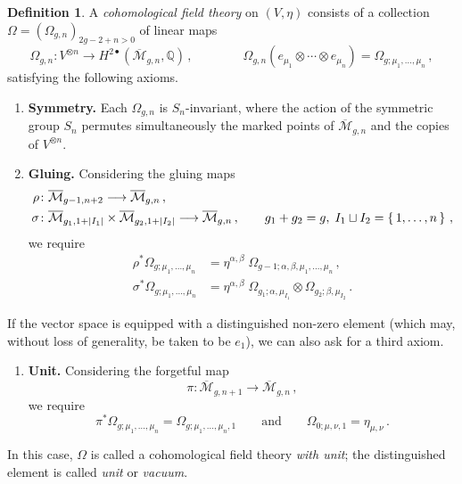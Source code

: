 \documentclass[11pt,reqno]{amsart}
\numberwithin{equation}{section}
\newcommand{\mb}[1]{\mathbb{#1}}
\newcommand{\mc}[1]{\mathcal{#1}}
\newcommand{\Q}{\mb{Q}}
\newcommand{\M}{\mc{M}}
\newcommand{\Mbar}{\overline{\M}}
\theoremstyle{plain}
\theoremstyle{definition}
\newtheorem{definition}[theorem]{Definition}
\begin{document}
\begin{definition}
  A \emph{cohomological field theory} on $(V,\eta)$ consists of a collection $\Omega = (\Omega_{g,n})_{2g-2+n>0}$ of linear maps
  \begin{equation}
    \Omega_{g,n} \colon V^{\otimes n} \longrightarrow H^{2\bullet}(\Mbar_{g,n},\Q) \,,
    \qquad\qquad
    \Omega_{g,n}(e_{\mu_1} \otimes \cdots \otimes e_{\mu_n})
    =
    \Omega_{g;\mu_1,\ldots,\mu_n} \,,
  \end{equation}
  satisfying the following axioms.
  \begin{enumerate}
    \item[i)] \textbf{Symmetry.} Each $\Omega_{g,n}$ is $S_n$-invariant, where the action of the symmetric group $S_n$ permutes simultaneously the marked points of $\Mbar_{g,n}$ and the copies of $V^{\otimes n}$.

    \item[ii)] \textbf{Gluing.} Considering the gluing maps
    \begin{equation}
    \begin{aligned}
      \rho \colon& \Mbar_{g-1,n+2} \longrightarrow \Mbar_{g,n} \,, \\
      \sigma \colon& \Mbar_{g_1,1+|I_1|} \times \Mbar_{g_2,1+|I_2|}  \longrightarrow \Mbar_{g,n} \,,
      \qquad
      g_1 + g_2 = g, \; I_1 \sqcup I_2 = \set{1,\dots,n} \,,
    \end{aligned}
    \end{equation}
    we require
    \begin{equation}
    \begin{aligned}
      \rho^{\ast} \Omega_{g;\mu_1,\ldots,\mu_n}
      & =
      \eta^{\alpha,\beta} \; \Omega_{g-1;\alpha,\beta,\mu_1,\ldots,\mu_n}
      \,, \\
      \sigma^{\ast} \Omega_{g;\mu_1,\ldots,\mu_n}
      & =
      \eta^{\alpha,\beta} \; \Omega_{g_1;\alpha,\mu_{I_1}} \otimes \Omega_{g_2;\beta,\mu_{I_2}} \,.
    \end{aligned}
    \end{equation}
  \end{enumerate}
  If the vector space is equipped with a distinguished non-zero element (which may, without loss of generality, be taken to be $e_1$), we can also ask for a third axiom.
  \begin{enumerate}
    \item[iii)] \textbf{Unit.} Considering the forgetful map
    \begin{equation}
      \pi \colon \Mbar_{g,n+1} \longrightarrow \Mbar_{g,n} \,,
    \end{equation}
    we require
    \begin{equation}
      \pi^{\ast} \Omega_{g;\mu_1,\ldots,\mu_n}
      =
      \Omega_{g;\mu_1,\ldots,\mu_n,1}
      \qquad\text{and}\qquad
      \Omega_{0;\mu,\nu,1}
      =
      \eta_{\mu,\nu} \,.
    \end{equation}
  \end{enumerate}
  In this case, $\Omega$ is called a cohomological field theory \emph{with unit}; the distinguished element is called \emph{unit} or \emph{vacuum}.
\end{definition}
\end{document}
